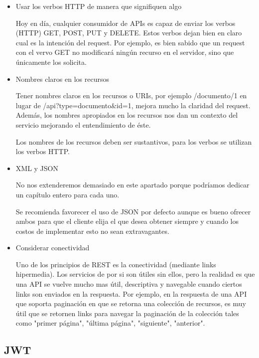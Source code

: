 \begin{itemize}

	\item Usar los verbos HTTP de manera que signifiquen algo
	
	Hoy en día, cualquier consumidor de APIs es capaz de enviar los verbos (HTTP) GET, 
	POST, PUT y DELETE. Estos verbos dejan bien en claro cual es la intención del request. 
	Por ejemplo, es bien sabido que un request con el vervo GET no modificará ningún 
	recurso en el servidor, sino que únicamente los solicita.
	
	\item Nombres claros en los recursos
	
	Tener nombres claros en los recursos o URIs, por ejemplo /documento/1 en lugar de 
	/api?type=documento\&id=1, mejora mucho la claridad del request. Además, los nombres 
	apropiados en los recursos nos dan un contexto del servicio mejorando el entendimiento 
	de éste. 
	
	Los nombres de los recursos deben ser sustantivos, para los verbos se utilizan los 
	verbos HTTP.
	
	\item XML y JSON
	
	No nos extenderemos demasiado en este apartado porque podríamos dedicar un capítulo 
	entero para cada uno.
	
	Se recomienda favorecer el uso de JSON por defecto aunque es bueno ofrecer ambos para 
	que el cliente elija el que desea obtener siempre y cuando los costos de implementar 
	esto no sean extravagantes.
	
	\item Considerar conectividad
	
	Uno de los principios de REST es la conectividad (mediante links hipermedia). Los 
	servicios de por si son útiles sin ellos, pero la realidad es que una API se vuelve 
	mucho mas útil, descriptiva y navegable cuando ciertos links son enviados en la 
	respuesta. Por ejemplo, en la respuesta de una API que soporta paginación en que se 
	retorna una colección de recursos, es muy útil que se retornen links para navegar 
	la paginación de la colección tales como "primer página", "última página", 
	"siguiente", "anterior".

\end{itemize}


\subsection{JWT}

